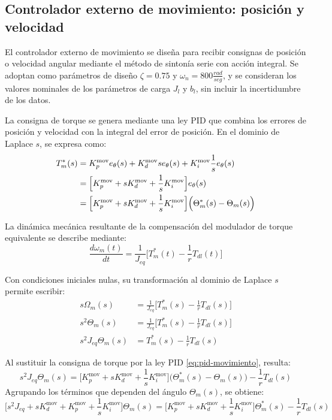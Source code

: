 \documentclass[blue,fullpaper]{ludusofficial}  %
\begin{document}
\subsection{Controlador externo de movimiento: posición y velocidad}

El controlador externo de movimiento se diseña para recibir consignas de posición o velocidad angular mediante el método de sintonía serie con acción integral. Se adoptan como parámetros de diseño $\zeta = 0.75$ y $\omega_{n}=800 \frac{rad}{seg}$, y se consideran los valores nominales de los parámetros de carga $J_{l}$ y $b_{l}$, sin incluir la incertidumbre de los datos.

La consigna de torque se genera mediante una ley PID que combina los errores de posición y velocidad con la integral del error de posición. En el dominio de Laplace $s$, se expresa como:
\begin{align}
T_{m}^{*}(s) & = K_{p}^{\text{mov}}e_{\theta}(s) + K_{d}^{\text{mov}}s e_{\theta}(s) + K_{i}^{\text{mov}} \frac{1}{s} e_{\theta}(s)
\notag \\
 & = \Big[  K_{p}^{\text{mov}} + sK_{d}^{\text{mov}} + \frac{1}{s}K_{i}^{\text{mov}} \Big] e_{\theta}(s)
\notag \\
 & = \Big[  K_{p}^{\text{mov}} + sK_{d}^{\text{mov}} + \frac{1}{s}K_{i}^{\text{mov}} \Big] \Big( \Theta^{*}_{m}(s) - \Theta_{m}(s) \Big) %
\label{eq:pid-movimiento}
\end{align}

La dinámica mecánica resultante de la compensación del modulador de torque equivalente se describe mediante:
\begin{equation}
\label{eq:mecanica-compensada}
\frac{d\omega_{m}(t)}{dt} = \frac{1}{J_{eq}} \Big[ T_{m}^{*}(t)- \frac{1}{r} T_{dl}(t) \Big]
\end{equation}

Con condiciones iniciales nulas, su transformación al dominio de Laplace $s$ permite escribir:
\begin{align*}
s\Omega_{m}(s)  & = \frac{1}{J_{eq}} \Big[ T_{m}^{*}(s)- \frac{1}{r} T_{dl}(s) \Big] \\ 
s^{2}\Theta_{m}(s)  & = \frac{1}{J_{eq}} \Big[ T_{m}^{*}(s)- \frac{1}{r} T_{dl}(s) \Big] \\
s^{2}J_{eq} \Theta_{m}(s)  & = T_{m}^{*}(s)- \frac{1}{r} T_{dl}(s) 
\end{align*}

Al sustituir la consigna de torque por la ley PID \eqref{eq:pid-movimiento}, %
resulta:
\[
s^{2}J_{eq} \Theta_{m}(s) = \Big[  K_{p}^{\text{mov}} + sK_{d}^{\text{mov}} + \frac{1}{s}K_{i}^{\text{mov}} \Big] \Big( \Theta^{*}_{m}(s) - \Theta_{m}(s) \Big) - \frac{1}{r} T_{dl}(s) 
\]
Agrupando los términos que dependen del ángulo $\Theta_m(s)$, se obtiene:
\[
\Big[ s^{2}J_{eq} + sK_{d}^{\text{mov}} + K_{p}^{\text{mov}}  + \frac{1}{s}K_{i}^{\text{mov}} \Big] \Theta_{m}(s) = \Big[  K_{p}^{\text{mov}} + sK_{d}^{\text{mov}} + \frac{1}{s}K_{i}^{\text{mov}} \Big] \Theta^{*}_{m}(s) - \frac{1}{r} T_{dl}(s) 
\]
\end{document}
